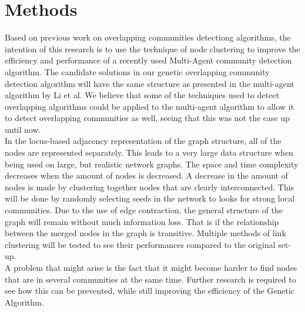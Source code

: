 \documentclass[twoside,twocolumn]{article}
\begin{document}

\section{Methods}
Based on previous work on overlapping communities detectiong algorithms, the intention of this research is to use the technique of node clustering\cite{Ding2016} to improve the efficiency and performance of a recently used Multi-Agent community detection algorithm\cite{multiagent2016}.
The candidate solutions in our genetic overlapping community detection algorithm will have the same structure as presented in the multi-agent algorithm by Li et al. 
We believe that some of the techniques used to detect overlapping algorithms could be applied to the multi-agent algorithm to allow it to detect overlapping communities as well, seeing that this was not the case up until now.\\ \newline
In the locus-based adjacency representation of the graph structure, all of the nodes are represented separately. This leads to a very large data structure when being used on large, but realistic network graphs. 
The space and time complexity decreases when the amount of nodes is decreased.
A decrease in the amount of nodes is made by clustering together nodes that are clearly interconnected.
This will be done by randomly selecting seeds in the network to looks for strong local communities.
Due to the use of edge contraction, the general structure of the graph will remain without much information loss. That is if the relationship between the merged nodes in the graph is transitive.
Multiple methods of link clustering will be tested to see their performances compared to the original set-up.\\ \newline
A problem that might arise is the fact that it might become harder to find nodes that are in several communities at the same time.
Further research is required to see how this can be prevented, while still improving the efficiency of the Genetic Algorithm.





\end{document}
